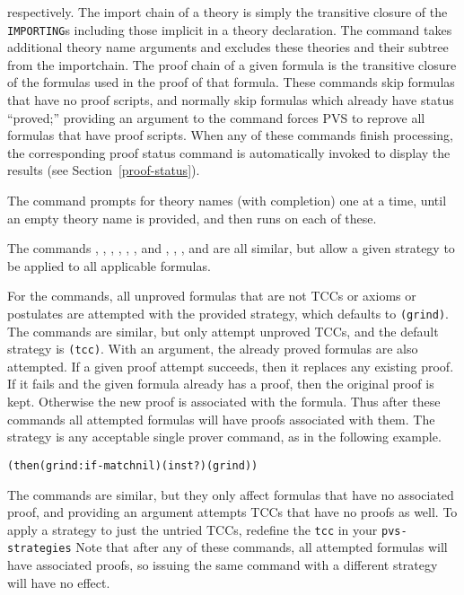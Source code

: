 respectively.  The import chain of a theory is simply the transitive
closure of the \texttt{IMPORTING}s including those implicit in a theory
declaration.  The  command takes additional
theory name arguments and excludes these theories and their subtree from
the importchain.  The proof chain of a given formula is the transitive
closure of the formulas used in the proof of that formula.  These
commands skip formulas that have no proof scripts, and normally skip
formulas which already have status ``proved;'' providing an argument to
the command forces PVS to reprove all formulas that have proof scripts.
When any of these commands finish processing, the corresponding proof
status command is automatically invoked to
display the results (see Section~\ref{proof-status}).

The  command prompts for theory names (with
completion) one at a time, until an empty theory name is provided, and
then runs  on each of these.


The commands , ,
, 
, ,
, and 
, ,
, and
 are all similar, but allow a
given strategy to be applied to all applicable formulas.

For the  commands, all unproved formulas that are not
TCCs or axioms or postulates are attempted with the provided strategy,
which defaults to \texttt{(grind)}.  The  commands are
similar, but only attempt unproved TCCs, and the default strategy is
\texttt{(tcc)}.  With an argument, the already proved formulas are also
attempted.  If a given proof attempt succeeds, then it replaces any
existing proof.  If it fails and the given formula already has a proof,
then the original proof is kept.  Otherwise the new proof is associated
with the formula.  Thus after these commands all attempted formulas will
have proofs associated with them.  The strategy is any acceptable single
prover command, as in the following example.
\begin{alltt}
  (then (grind :if-match nil) (inst?) (grind))
\end{alltt}

The  commands are similar, but they only affect
formulas that have no associated proof, and providing an argument attempts
TCCs that have no proofs as well.  To apply a strategy to just the untried
TCCs, redefine the \texttt{tcc}
in your \texttt{pvs-strategies}
Note that after any of these commands,
all attempted formulas will have associated proofs, so issuing the same
command with a different strategy will have no effect.

